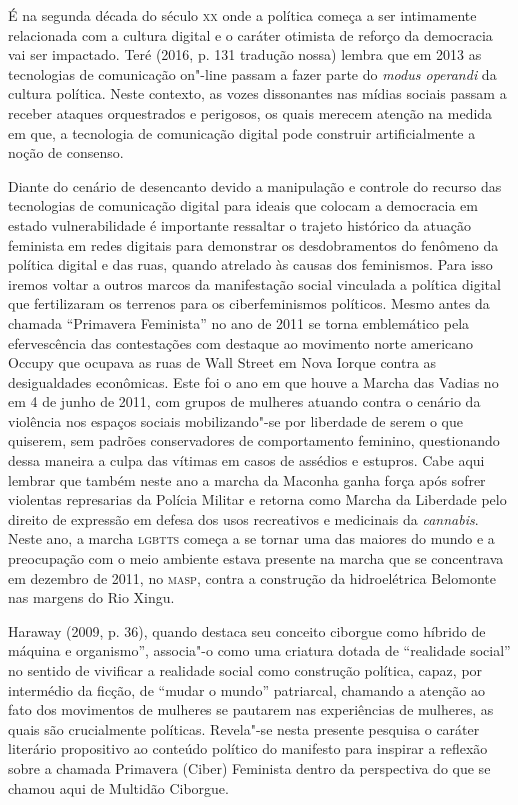 É na segunda década do século \textsc{xx} onde a política começa a ser
intimamente relacionada com a cultura digital e o caráter otimista de
reforço da democracia vai ser impactado. Teré (2016, p. 131 tradução
nossa) lembra que em 2013 as tecnologias de comunicação on"-line passam a
fazer parte do \emph{modus operandi} da cultura política. Neste
contexto, as vozes dissonantes nas mídias sociais passam a receber
ataques orquestrados e perigosos, os quais merecem atenção na medida em
que, a tecnologia de comunicação digital pode construir artificialmente
a noção de consenso.

Diante do cenário de desencanto devido a manipulação e controle do
recurso das tecnologias de comunicação digital para ideais que colocam a
democracia em estado vulnerabilidade é importante ressaltar o trajeto
histórico da atuação feminista em redes digitais para demonstrar os
desdobramentos do fenômeno da política digital e das ruas, quando
atrelado às causas dos feminismos. Para isso iremos voltar a outros
marcos da manifestação social vinculada a política digital que
fertilizaram os terrenos para os ciberfeminismos políticos. Mesmo antes
da chamada ``Primavera Feminista'' no ano de 2011 se torna emblemático
pela efervescência das contestações com destaque ao movimento norte
americano Occupy que ocupava as ruas de Wall Street em Nova Iorque
contra as desigualdades econômicas. Este foi o ano em que houve a Marcha
das Vadias no em 4 de junho de 2011, com grupos de mulheres atuando
contra o cenário da violência nos espaços sociais mobilizando"-se por
liberdade de serem o que quiserem, sem padrões conservadores de
comportamento feminino, questionando dessa maneira a culpa das vítimas
em casos de assédios e estupros. Cabe aqui lembrar que também neste ano
a marcha da Maconha ganha força após sofrer violentas represarias da
Polícia Militar e retorna como Marcha da Liberdade pelo direito de
expressão em defesa dos usos recreativos e medicinais da
\emph{cannabis}. Neste ano, a marcha \textsc{lgbtts} começa a se tornar uma das
maiores do mundo e a preocupação com o meio ambiente estava presente na
marcha que se concentrava em dezembro de 2011, no \textsc{masp}, contra a
construção da hidroelétrica Belomonte nas margens do Rio Xingu.

Haraway (2009, p. 36), quando destaca seu conceito ciborgue como híbrido
de máquina e organismo'', associa"-o como uma criatura dotada de
``realidade social'' no sentido de vivificar a realidade social como
construção política, capaz, por intermédio da ficção, de ``mudar o
mundo'' patriarcal, chamando a atenção ao fato dos movimentos de
mulheres se pautarem nas experiências de mulheres, as quais são
crucialmente políticas. Revela"-se nesta presente pesquisa o caráter
literário propositivo ao conteúdo político do manifesto para inspirar a
reflexão sobre a chamada Primavera (Ciber) Feminista dentro da
perspectiva do que se chamou aqui de Multidão Ciborgue.

